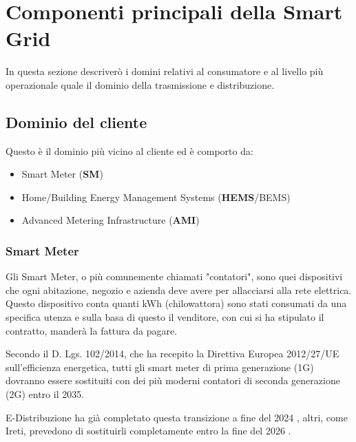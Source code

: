 \section{Componenti principali della Smart Grid}

In questa sezione descriverò i domini relativi al consumatore e al livello più operazionale quale il dominio della trasmissione e distribuzione.

\subsection{Dominio del cliente}

Questo è il dominio più vicino al cliente ed è comporto da:

\begin{itemize}
    \item Smart Meter (\textbf{SM}) 
    \item Home/Building Energy Management Systems (\textbf{HEMS}/BEMS)
    \item Advanced Metering Infrastructure (\textbf{AMI})
\end{itemize}

\subsubsection{Smart Meter}

Gli Smart Meter, o più comunemente chiamati "contatori", sono quei dispositivi che ogni abitazione, negozio e azienda deve avere per allacciarsi alla rete elettrica.
Questo dispositivo conta quanti kWh (chilowattora) sono stati consumati da una specifica utenza e sulla basa di questo il venditore, con cui si ha stipulato il contratto, manderà la fattura da pagare.


Secondo il D. Lgs. 102/2014, che ha recepito la Direttiva Europea 2012/27/UE sull'efficienza energetica, tutti gli smart meter di prima generazione (1G) dovranno essere sostituiti con dei più moderni contatori di seconda generazione (2G) entro il 2035.

E-Distribuzione ha già completato questa transizione a fine del 2024 \cite{sostituzione-contatori-e-dist}, altri, come Ireti, prevedono di sostituirli completamente entro la fine del 2026 \cite{sostituzione-contatori-Ireti}.



